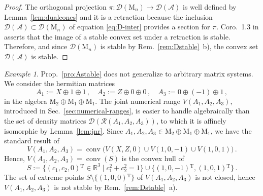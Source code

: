 \documentclass[a4paper,11pt,reqno]{amsart}
\newcommand{\R}{\mathbb{R}}
\newcommand{\M}{\mathrm{M}}
\newcommand{\cA}{\mathcal{A}}
\newcommand{\cD}{\mathcal{D}}
\newcommand{\cR}{\mathcal{R}}
\newcommand{\tp}{{}^\mathrm{T}}
\DeclareMathOperator\conv{conv}
\theoremstyle{definition}
\theoremstyle{remark}
\newtheorem{exa}[thm]{Example}
\numberwithin{equation}{section}
\begin{document}
%
\begin{proof}
The orthogonal projection $\pi:\cD(\M_n)\to\cD(\cA)$ is well defined by 
Lemma~\ref{lem:dualcones} and it is a retraction because the inclusion 
$\cD(\cA)\subset\cD(\M_n)$ of equation \eqref{eq:D-inter} provides a 
section for $\pi$. Coro.~1.3 in \cite{Clausing1978} asserts that the 
image of a stable convex set under a retraction is stable. Therefore, 
and since $\cD(\M_n)$ is stable by Rem.~\ref{rem:Dstable}~b), the convex 
set $\cD(\cA)$ is stable.
\end{proof}
%
\begin{exa}
Prop.~\ref{pro:Astable} does not generalize to arbitrary matrix systems. 
We consider the hermitian matrices 
\[
A_1:=X\oplus 1\oplus 1\,,
\quad
A_2:=Z\oplus 0\oplus 0\,, 
\quad 
A_3:=0\oplus (-1)\oplus 1\,,
\]
in the algebra $\M_2\oplus\M_1\oplus\M_1$. The joint numerical range 
$V(A_1,A_2,A_3)$, introduced in Sec.~\ref{sec:numerical-ranges}, is easier 
to handle algebraically than the set of density matrices 
$\cD(\cR(A_1,A_2,A_3))$, to which it is affinely isomorphic by 
Lemma~\ref{lem:jnr}. Since $A_1,A_2,A_3\in\M_2\oplus\M_1\oplus\M_1$, we 
have the standard result of 
\[\textstyle
V(A_1,A_2,A_3)
=\conv\big( V(X,Z,0)
\cup V(1,0,-1)
\cup V(1,0,1) \big)\,.
\]
Hence, $V(A_1,A_2,A_3)=\conv(S)$ is the convex hull of 
\[\textstyle
S:=\{(c_1,c_2,0)\tp\in\R^3\mid c_1^2+c_2^2=1\}
\cup\{(1,0,-1)\tp,(1,0,1)\tp\}\,.
\]
The set of extreme points $S\setminus\{(1,0,0)\tp\}$ of $V(A_1,A_2,A_3)$ is 
not closed, hence $V(A_1,A_2,A_3)$ is not stable by Rem.~\ref{rem:Dstable}~a).
\end{exa}
%
%
\end{document}
